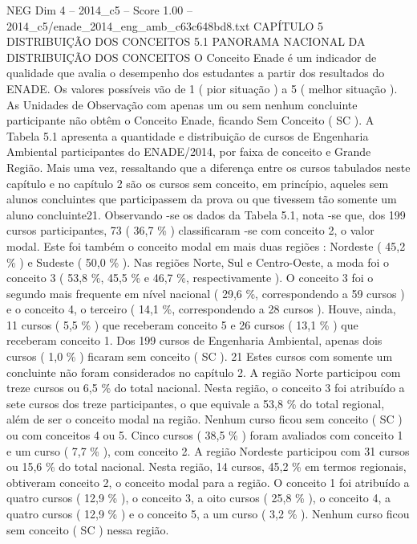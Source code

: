 \begin{textsample}{NEG Dim 4 – 2014\_c5 – Score 1.00 – 2014\_c5/enade\_2014\_eng\_amb\_c63c648bd8.txt}  \label{ex:f4_neg_207}
CAPÍTULO 5 DISTRIBUIÇÃO DOS CONCEITOS 5.1 PANORAMA NACIONAL DA DISTRIBUIÇÃO DOS CONCEITOS O Conceito Enade é um indicador de qualidade que avalia o desempenho dos estudantes a partir dos resultados do ENADE.
Os valores possíveis vão de 1 ( pior situação ) a 5 ( melhor situação ).
As Unidades de Observação com apenas um ou sem nenhum concluinte participante não obtêm o Conceito Enade, ficando Sem Conceito ( SC ).
A Tabela 5.1 apresenta a quantidade e distribuição de cursos de Engenharia Ambiental participantes do ENADE/2014, por faixa de conceito e Grande Região.
Mais uma vez, ressaltando que a diferença entre os cursos tabulados neste capítulo e no capítulo 2 são os cursos sem conceito, em princípio, aqueles sem alunos concluintes que participassem da prova ou que tivessem tão somente um aluno concluinte21.
Observando -se os dados da Tabela 5.1, nota -se que, dos 199 cursos participantes, 73 ( 36,7 \% ) classificaram -se com conceito 2, o valor modal.
Este foi também o conceito modal em mais duas regiões : Nordeste ( 45,2 \% ) e Sudeste ( 50,0 \% ).
Nas regiões Norte, Sul e Centro-Oeste, a moda foi o conceito 3 ( 53,8 \%, 45,5 \% e 46,7 \%, respectivamente ).
O conceito 3 foi o segundo mais frequente em nível nacional ( 29,6 \%, correspondendo a 59 cursos ) e o conceito 4, o terceiro ( 14,1 \%, correspondendo a 28 cursos ).
Houve, ainda, 11 cursos ( 5,5 \% ) que receberam conceito 5 e 26 cursos ( 13,1 \% ) que receberam conceito 1.
Dos 199 cursos de Engenharia Ambiental, apenas dois cursos ( 1,0 \% ) ficaram sem conceito ( SC ). 21 Estes cursos com somente um concluinte não foram considerados no capítulo 2.
A região Norte participou com treze cursos ou 6,5 \% do total nacional.
Nesta região, o conceito 3 foi atribuído a sete cursos dos treze participantes, o que equivale a 53,8 \% do total regional, além de ser o conceito modal na região.
Nenhum curso ficou sem conceito ( SC ) ou com conceitos 4 ou 5.
Cinco cursos ( 38,5 \% ) foram avaliados com conceito 1 e um curso ( 7,7 \% ), com conceito 2.
A região Nordeste participou com 31 cursos ou 15,6 \% do total nacional.
Nesta região, 14 cursos, 45,2 \% em termos regionais, obtiveram conceito 2, o conceito modal para a região.
O conceito 1 foi atribuído a quatro cursos ( 12,9 \% ), o conceito 3, a oito cursos ( 25,8 \% ), o conceito 4, a quatro cursos ( 12,9 \% ) e o conceito 5, a um curso ( 3,2 \% ).
Nenhum curso ficou sem conceito ( SC ) nessa região.

\end{textsample}
